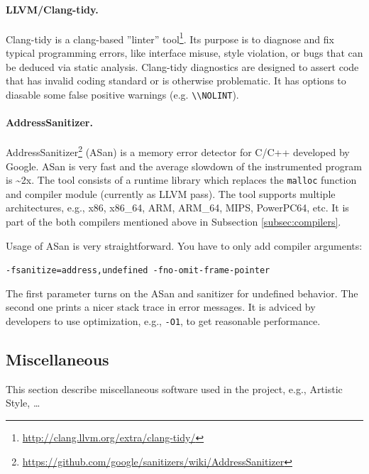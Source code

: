 \paragraph{LLVM/Clang-tidy.}
Clang-tidy is a clang-based ''linter'' tool\footnote{\url{http://clang.llvm.org/extra/clang-tidy/}}.
Its purpose is to diagnose and fix typical programming errors,
like interface misuse, style violation, or bugs that can be deduced via static analysis.
Clang-tidy diagnostics are designed to assert code that has invalid coding standard or is otherwise problematic.
It has options to diasable some false positive warnings (e.g. \texttt{\textbackslash\textbackslash NOLINT}).

\paragraph{AddressSanitizer.}
AddressSanitizer\footnote{\url{https://github.com/google/sanitizers/wiki/AddressSanitizer}} (ASan) is a memory error detector for C/C++ developed by Google.
ASan is very fast and the average slowdown of the instrumented program is \textasciitilde 2x.
The tool consists of a runtime library which replaces the \texttt{malloc} function and compiler module (currently as LLVM pass).
The tool supports multiple architectures, e.g., x86, x86\_64, ARM, ARM\_64, MIPS, PowerPC64, etc.
It is part of the both compilers mentioned above in Subsection \ref{subsec:compilers}.

Usage of ASan is very straightforward. You have to only add compiler arguments:\\
\begin{center}
	\texttt{-fsanitize=address,undefined -fno-omit-frame-pointer}
\end{center}
The first parameter turns on the ASan and sanitizer for undefined behavior. The
second one prints a nicer stack trace in error messages. It is adviced by
developers to use optimization, e.g., \texttt{-O1}, to get reasonable
performance.

\subsection{Miscellaneous}
This section describe miscellaneous software used in the project, e.g., Artistic Style, \ldots
